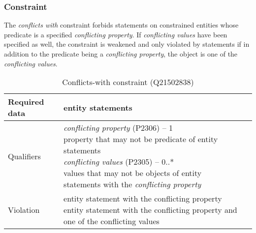 \documentclass[hyperref,bachelorofscience,fleqn]{cgvpub}
\begin{document}
\subsubsection{Constraint}
The \emph{conflicts with} constraint forbids statements on constrained entities whose predicate is a specified \emph{conflicting property}. If \emph{conflicting values} have been specified as well, the constraint is weakened and only violated by statements if in addition to the predicate being a \emph{conflicting property}, the object is one of the \emph{conflicting values}.
\begin{table}[H]
\caption{Conflicts-with constraint (Q21502838)}
\begin{tabularx}{\textwidth}{ ll X}
\hline
Required data & entity statements \\
\hline
Qualifiers & \makecell{\emph{conflicting property} (P2306) -- 1 \\ property that may not be predicate of entity statements \\
\emph{conflicting values} (P2305) -- 0..* \\ values that may not be objects of entity statements with the \emph{conflicting property}} \\
\hline
Violation & \makecell{entity statement with the conflicting property \\ entity statement with the conflicting property and one of the conflicting values} \\
\hline
\end{tabularx}
\end{table}
\end{document}
